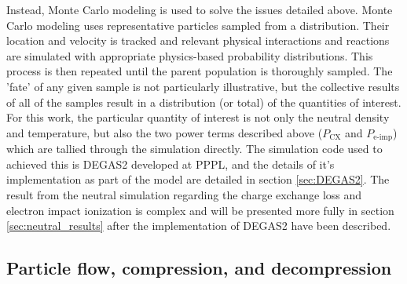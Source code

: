 \begin{refsection}
Instead, Monte Carlo modeling is used to solve the issues detailed above. Monte Carlo modeling uses representative particles sampled from a distribution. Their location and velocity is tracked and relevant physical interactions and reactions are simulated with appropriate physics-based probability distributions. This process is then repeated until the parent population is thoroughly sampled. The 'fate' of any given sample is not particularly illustrative, but the collective results of all of the samples result in a distribution (or total) of the quantities of interest. For this work, the particular quantity of interest is not only the neutral density and temperature, but also the two power terms described above ($P_{\text{CX}}$ and $P_{\text{e-imp}}$) which are tallied through the simulation directly. The simulation code used to achieved this is DEGAS2 developed at PPPL\cite{Stotler}, and the details of it's implementation as part of the model are detailed in section \ref{sec:DEGAS2}. The result from the neutral simulation regarding the charge exchange loss and electron impact ionization is complex and will be presented more fully in section \ref{sec:neutral_results} after the implementation of DEGAS2 have been described. 

\subsection{Particle flow, compression, and decompression}\label{sec:flow_effects}


\end{refsection}
